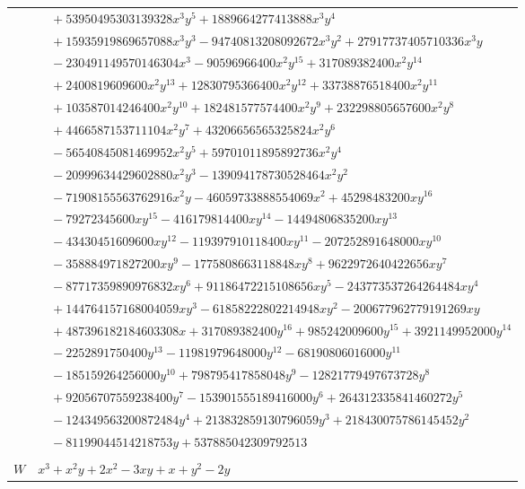 \documentclass[11pt]{article}
\begin{document}
\begin{longtable}{@{}ll@{}}
 & $\quad +53950495303139328x^{3}y^{5}+1889664277413888x^{3}y^{4}$\\
 & $\quad +15935919869657088x^{3}y^{3}-94740813208092672x^{3}y^{2}+27917737405710336x^{3}y$\\
 & $\quad -230491149570146304x^{3}-90596966400x^{2}y^{15}+317089382400x^{2}y^{14}$\\
 & $\quad +2400819609600x^{2}y^{13}+12830795366400x^{2}y^{12}+33738876518400x^{2}y^{11}$\\
 & $\quad +103587014246400x^{2}y^{10}+182481577574400x^{2}y^{9}+232298805657600x^{2}y^{8}$\\
 & $\quad +4466587153711104x^{2}y^{7}+43206656565325824x^{2}y^{6}$\\
 & $\quad -56540845081469952x^{2}y^{5}+59701011895892736x^{2}y^{4}$\\
 & $\quad -20999634429602880x^{2}y^{3}-139094178730528464x^{2}y^{2}$\\
 & $\quad -71908155563762916x^{2}y-46059733888554069x^{2}+45298483200xy^{16}$\\
 & $\quad -79272345600xy^{15}-416179814400xy^{14}-14494806835200xy^{13}$\\
 & $\quad -43430451609600xy^{12}-119397910118400xy^{11}-207252891648000xy^{10}$\\
 & $\quad -358884971827200xy^{9}-1775808663118848xy^{8}+9622972640422656xy^{7}$\\
 & $\quad -87717359890976832xy^{6}+91186472215108656xy^{5}-243773537264264484xy^{4}$\\
 & $\quad +144764157168004059xy^{3}-61858222802214948xy^{2}-200677962779191269xy$\\
 & $\quad +487396182184603308x+317089382400y^{16}+985242009600y^{15}+3921149952000y^{14}$\\
 & $\quad -2252891750400y^{13}-11981979648000y^{12}-68190806016000y^{11}$\\
 & $\quad -185159264256000y^{10}+798795417858048y^{9}-12821779497673728y^{8}$\\
 & $\quad +92056707559238400y^{7}-153901555189416000y^{6}+264312335841460272y^{5}$\\
 & $\quad -124349563200872484y^{4}+213832859130796059y^{3}+218430075786145452y^{2}$\\
 & $\quad -81199044514218753y+537885042309792513$\\
\addlinespace[3pt]
\multicolumn{2}{@{}l}{$i=106$, $m=2$, neighbours $10,26$}\\
$W$ & $x^{3}+x^{2}y+2x^{2}-3xy+x+y^{2}-2y$\\

\end{longtable}
\end{document}
